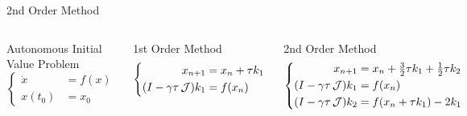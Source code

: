 \begin{frame}{2nd Order Method \parencite{Lang2015,Mena2007}}
  \begin{equation*}
  \end{equation*}
\end{frame}

\begin{frame}
\begin{columns}
\begin{block}{Autonomous Initial Value Problem}
  \begin{equation*}
  \left\{
  \begin{aligned}
    \dot x &= f(x) \\
    x(t_0) &= x_0
  \end{aligned}
  \right.
  \end{equation*}
\end{block}

  \begin{block}{1st Order Method}
    \begin{equation*}
    \left\{
    \begin{aligned}
      x_{n+1} &= x_n + \tau k_1 \\
      (I - \gamma\tau \operatorname{\mathcal J}) k_1 &= f(x_n)
    \end{aligned}
    \right.
    \end{equation*}
  \end{block}
  \begin{block}{2nd Order Method \parencite{Verwer1999}}
    \vspace*{-\baselineskip}
    \begin{equation*}
    \left\{
    \begin{aligned}
      x_{n+1} &= x_n + \tfrac{3}{2} \tau k_1 + \tfrac{1}{2} \tau k_2 \\
      (I - \gamma\tau \operatorname{\mathcal J}) k_1 &= f(x_n) \\
      (I - \gamma\tau \operatorname{\mathcal J}) k_2 &= f(x_n + \tau k_1) - 2k_1
    \end{aligned}
    \right.
    \end{equation*}
  \end{block}
\end{columns}
\end{frame}
